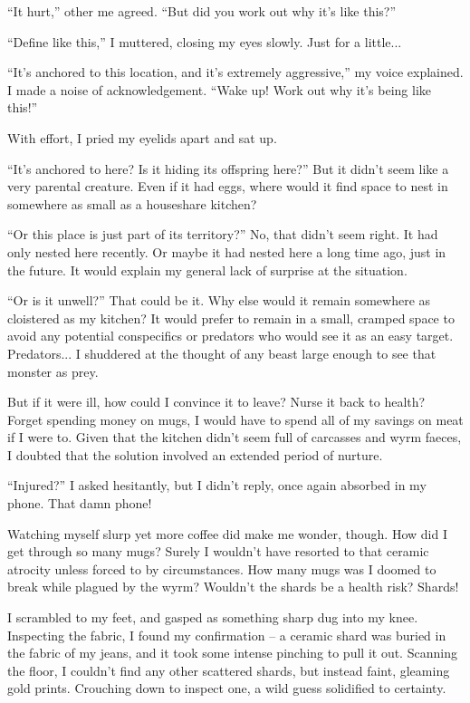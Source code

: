 ``It hurt,'' other me agreed. “But did you work out why it’s like this?''

``Define like this,'' I muttered, closing my eyes slowly. Just for a little...

``It's anchored to this location, and it's extremely aggressive,'' my voice explained. I made a noise of acknowledgement. ``Wake up! Work out why it's being like this!''

With effort, I pried my eyelids apart and sat up.

``It's anchored to here? Is it hiding its offspring here?'' But it didn't seem like a very parental creature. Even if it had eggs, where would it find space to nest in somewhere as small as a houseshare kitchen?

``Or this place is just part of its territory?'' No, that didn't seem right. It had only nested here recently. Or maybe it had nested here a long time ago, just in the future. It would explain my general lack of surprise at the situation.

``Or is it unwell?'' That could be it. Why else would it remain somewhere as cloistered as my kitchen? It would prefer to remain in a small, cramped space to avoid any potential conspecifics or predators who would see it as an easy target. Predators... I shuddered at the thought of any beast large enough to see that monster as prey.

But if it were ill, how could I convince it to leave? Nurse it back to health? Forget spending money on mugs, I would have to spend all of my savings on meat if I were to. Given that the kitchen didn't seem full of carcasses and wyrm faeces, I doubted that the solution involved an extended period of nurture.

``Injured?'' I asked hesitantly, but I didn't reply, once again absorbed in my phone. That damn phone!

Watching myself slurp yet more coffee did make me wonder, though. How did I get through so many mugs? Surely I wouldn't have resorted to that ceramic atrocity unless forced to by circumstances. How many mugs was I doomed to break while plagued by the wyrm? Wouldn't the shards be a health risk? Shards!

I scrambled to my feet, and gasped as something sharp dug into my knee. Inspecting the fabric, I found my confirmation – a ceramic shard was buried in the fabric of my jeans, and it took some intense pinching to pull it out. Scanning the floor, I couldn't find any other scattered shards, but instead faint, gleaming gold prints. Crouching down to inspect one, a wild guess solidified to certainty.

